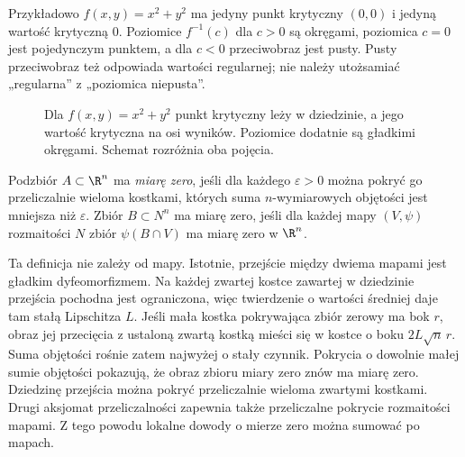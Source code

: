 Przykładowo $f(x,y)=x^2+y^2$ ma jedyny punkt
krytyczny $(0,0)$ i jedyną wartość krytyczną $0$.
Poziomice $f^{-1}(c)$ dla $c>0$ są okręgami, poziomica
$c=0$ jest pojedynczym punktem, a dla $c<0$
przeciwobraz jest pusty. Pusty przeciwobraz też
odpowiada wartości regularnej; nie należy utożsamiać
„regularna” z „poziomica niepusta”.

\begin{figure}[H]
\centering
{}
\caption{Dla $f(x,y)=x^2+y^2$ punkt krytyczny leży w
dziedzinie, a jego wartość krytyczna na osi wyników.
Poziomice dodatnie są gładkimi okręgami. Schemat
rozróżnia oba pojęcia.}
\label{fig:sard-poziomice}
\end{figure}

\begin{definicja}
\label{def:sard-zero-miary}
Podzbiór $A\subset\R^n$ ma \emph{miarę zero},
jeśli dla każdego $\varepsilon>0$ można pokryć go
przeliczalnie wieloma kostkami, których suma
$n$-wymiarowych objętości jest mniejsza niż
$\varepsilon$. Zbiór $B\subset N^n$ ma miarę zero,
jeśli dla każdej mapy $(V,\psi)$ rozmaitości $N$
zbiór $\psi(B\cap V)$ ma miarę zero w $\R^n$.
\end{definicja}

Ta definicja nie zależy od mapy. Istotnie, przejście
między dwiema mapami jest gładkim dyfeomorfizmem.
Na każdej zwartej kostce zawartej w dziedzinie przejścia
pochodna jest ograniczona, więc twierdzenie o wartości
średniej daje tam stałą Lipschitza $L$. Jeśli mała kostka
pokrywająca zbiór zerowy ma bok $r$, obraz jej przecięcia
z ustaloną zwartą kostką mieści się w kostce o boku $2L\sqrt n\,r$.
Suma objętości rośnie zatem najwyżej o stały czynnik.
Pokrycia o dowolnie małej sumie objętości pokazują,
że obraz zbioru miary zero znów ma miarę zero. Dziedzinę przejścia można
pokryć przeliczalnie wieloma zwartymi kostkami.
Drugi aksjomat przeliczalności zapewnia także
przeliczalne pokrycie rozmaitości mapami. Z tego
powodu lokalne dowody o mierze zero można
sumować po mapach.

